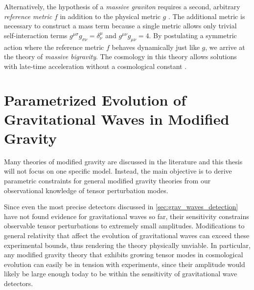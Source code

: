 \documentclass[12pt,parskip=half]{scrreprt}
\begin{document}
Alternatively, the hypothesis of a \emph{massive graviton} requires a second, arbitrary \emph{reference metric} \(f\) in addition to the physical metric \(g\) \autocite{deRham2014}. The additional metric is necessary to construct a mass term because a single metric allows only trivial self-interaction terms \(g^{\mu\sigma}g_{\sigma\nu}=\delta^\mu_\nu\) and \(g^{\mu\nu}g_{\mu\nu} = 4\). By postulating a symmetric action where the reference metric \(f\) behaves dynamically just like \(g\), we arrive at the theory of \emph{massive bigravity}.
The cosmology in this theory allows solutions with late-time acceleration without a cosmological constant \autocite{Konnig2014}.




\chapter{Parametrized Evolution of Gravitational Waves in Modified Gravity}\label{ch:param_mod_grav}

Many theories of modified gravity are discussed in the literature \autocite{Clifton2012,Euclid2013,deRham2014} and this thesis will not focus on one specific model. Instead, the main objective is to derive parametric constraints for general modified gravity theories from our observational knowledge of tensor perturbation modes.

Since even the most precise detectors discussed in \autoref{sec:grav_waves_detection} have not found evidence for gravitational waves so far, their sensitivity constrains observable tensor perturbations to extremely small amplitudes. Modifications to general relativity that affect the evolution of gravitational waves can exceed these experimental bounds, thus rendering the theory physically unviable. In particular, any modified gravity theory that exhibits growing tensor modes in cosmological evolution can easily be in tension with experiments, since their amplitude would likely be large enough today to be within the sensitivity of gravitational wave detectors.
\end{document}
